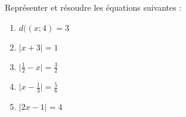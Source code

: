 
Représenter et résoudre les équations suivantes :
\begin{enumerate}
\item $d((x;4)=3$
\item $\vert x + 3 \vert = 1$
\item $\vert \frac{1}{2} - x \vert = \frac{3}{2}$
\item $\vert x - \frac{1}{3} \vert = \frac{5}{6}$
\item $\vert 2x - 1 \vert = 4$
\end{enumerate}  
